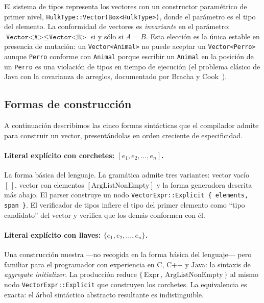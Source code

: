 \documentclass[11pt,a4paper,oneside,openany]{report}
\newcommand{\code}[1]{\texttt{#1}}
\begin{document}
El sistema de tipos representa los vectores con un constructor paramétrico
de primer nivel, \code{HulkType::Vector(Box<HulkType>)}, donde el parámetro
es el tipo del elemento. La conformidad de vectores es \emph{invariante} en
el parámetro: $\code{Vector<A>} \leq \code{Vector<B>}$ si y sólo si
$A = B$. Esta elección es la única estable en presencia de mutación: un
\code{Vector<Animal>} no puede aceptar un \code{Vector<Perro>} aunque
\code{Perro} conforme con \code{Animal} porque escribir un \code{Animal}
en la posición de un \code{Perro} es una violación de tipos en tiempo de
ejecución (el problema clásico de Java con la covarianza de arreglos,
documentado por Bracha y Cook~\cite{bracha1990}).

\subsection{Formas de construcción}
\label{subsec:formas-vec}

A continuación describimos las cinco formas sintácticas que el compilador
admite para construir un vector, presentándolas en orden creciente de
especificidad.

\paragraph{Literal explícito con corchetes:
$[e_1, e_2, \ldots, e_n]$.}
La forma básica del lenguaje. La gramática admite tres variantes: vector
vacío $[\,]$, vector con elementos $[\text{ArgListNonEmpty}]$ y la forma
generadora descrita más abajo. El parser construye un nodo
\code{VectorExpr::Explicit \{ elements, span \}}. El verificador de tipos
infiere el tipo del primer elemento como ``tipo candidato'' del vector y
verifica que los demás conformen con él.

\paragraph{Literal explícito con llaves: $\{e_1, e_2, \ldots, e_n\}$.}
Una construcción nuestra ---no recogida en la forma básica del lenguaje---
pero familiar para el programador con experiencia en C, C++ y Java: la
sintaxis de \emph{aggregate initializer}. La producción reduce
$\{\,\text{Expr}\,,\,\text{ArgListNonEmpty}\,\}$ al mismo nodo
\code{VectorExpr::Explicit} que construyen los corchetes. La equivalencia
es exacta: el árbol sintáctico abstracto resultante es indistinguible.
\end{document}
